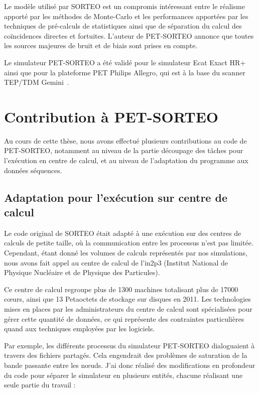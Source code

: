 Le modèle utilisé par SORTEO est un compromis intéressant entre le réalisme apporté par les méthodes de Monte-Carlo et les performances apportées par les techniques de pré-calculs de statistiques ainsi que de séparation du calcul des coïncidences directes et fortuites. L'auteur de PET-SORTEO annonce que toutes les sources majeures de bruit et de biais sont prises en compte.

Le simulateur PET-SORTEO a été validé pour le simulateur Ecat Exact HR+~\cite{reilhac2004pet} ainsi que pour la plateforme PET Philips Allegro, qui est à la base du scanner TEP/TDM Gemini~\cite{lemaitre2008}. 


	\section{Contribution à PET-SORTEO}

Au cours de cette thèse, nous avons effectué plusieurs contributions au code de PET-SORTEO, notamment au niveau de la partie découpage des tâches pour l'exécution en centre de calcul, et au niveau de l'adaptation du programme aux données séquences.

\subsection{Adaptation pour l'exécution sur centre de calcul}

Le code original de SORTEO était adapté à une exécution sur des centres de calculs de petite taille, où la communication entre les processus n’est pas limitée. Cependant, étant donné les volumes de calculs représentés par nos simulations, nous avons fait appel au centre de calcul de l'in2p3 (Institut National de Physique Nucléaire et de Physique des Particules).

Ce centre de calcul regroupe plus de 1300 machines totalisant plus de 17000 cœurs, ainsi que 13 Petaoctets de stockage sur disques en 2011. Les technologies mises en places par les administrateurs du centre de calcul sont spécialisées pour gérer cette quantité de données, ce qui représente des contraintes particulières quand aux techniques employées par les logiciels.

Par exemple, les différents processus du simulateur PET-SORTEO dialoguaient à travers des fichiers partagés. Cela engendrait des problèmes de saturation de la bande passante entre les nœuds. J'ai donc réalisé des modifications en profondeur du code pour séparer le simulateur en plusieurs entités, chacune réalisant une seule partie du travail :

